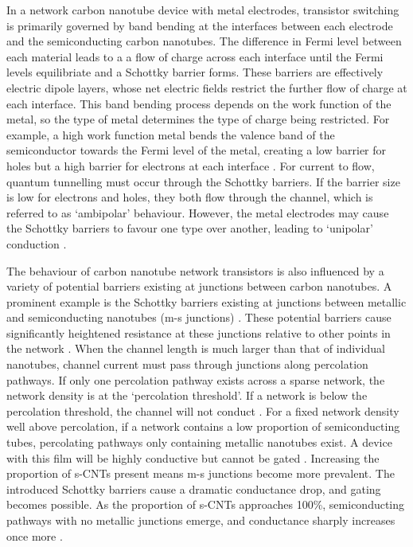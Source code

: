 \documentclass[
  a4paper,
]{scrbook}
\begin{document}
In a network carbon nanotube device with metal electrodes, transistor
switching is primarily governed by band bending at the interfaces
between each electrode and the semiconducting carbon nanotubes. The
difference in Fermi level between each material leads to a a flow of
charge across each interface until the Fermi levels equilibriate and a
Schottky barrier forms. These barriers are effectively electric dipole
layers, whose net electric fields restrict the further flow of charge at
each interface. This band bending process depends on the work function
of the metal, so the type of metal determines the type of charge being
restricted. For example, a high work function metal bends the valence
band of the semiconductor towards the Fermi level of the metal, creating
a low barrier for holes but a high barrier for electrons at each
interface \autocite{Avouris2007,Bargaoui2018}. For current to flow,
quantum tunnelling must occur through the Schottky barriers. If the
barrier size is low for electrons and holes, they both flow through the
channel, which is referred to as `ambipolar' behaviour. However, the
metal electrodes may cause the Schottky barriers to favour one type over
another, leading to `unipolar' conduction
\autocite{Avouris2007,Heller2008}.

The behaviour of carbon nanotube network transistors is also influenced
by a variety of potential barriers existing at junctions between carbon
nanotubes. A prominent example is the Schottky barriers existing at
junctions between metallic and semiconducting nanotubes (m-s junctions)
\autocite{Fuhrer2000,Topinka2009,Murugathas2019a}. These potential
barriers cause significantly heightened resistance at these junctions
relative to other points in the network \autocite{Fuhrer2000,Jang2015}.
When the channel length is much larger than that of individual
nanotubes, channel current must pass through junctions along percolation
pathways. If only one percolation pathway exists across a sparse
network, the network density is at the `percolation threshold'. If a
network is below the percolation threshold, the channel will not conduct
\autocite{Hu2004,Topinka2009,Jang2015}. For a fixed network density well
above percolation, if a network contains a low proportion of
semiconducting tubes, percolating pathways only containing metallic
nanotubes exist. A device with this film will be highly conductive but
cannot be gated \autocite{Fuhrer2000,Topinka2009}. Increasing the
proportion of s-CNTs present means m-s junctions become more prevalent.
The introduced Schottky barriers cause a dramatic conductance drop, and
gating becomes possible. As the proportion of s-CNTs approaches 100\%,
semiconducting pathways with no metallic junctions emerge, and
conductance sharply increases once more \autocite{Topinka2009}.
\end{document}
